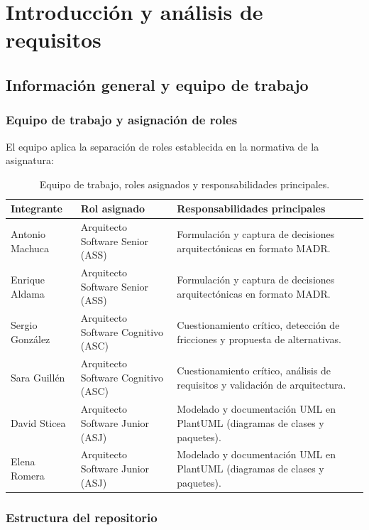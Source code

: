 \chapter{Introducción y análisis de requisitos}

\section{Información general y equipo de trabajo}


\subsection{Equipo de trabajo y asignación de roles}

El equipo aplica la separación de roles establecida en la normativa de la asignatura:

\begin{table}[H]
\centering
\caption{Equipo de trabajo, roles asignados y responsabilidades principales.}
\label{tab:equipo-roles}
\small
\begin{tabularx}{\textwidth}{@{}p{}p{}X@{}}
\toprule
\textbf{Integrante} & \textbf{Rol asignado} & \textbf{Responsabilidades principales} \\
\midrule
Antonio Machuca & Arquitecto Software Senior (ASS) & Formulación y captura de decisiones arquitectónicas en formato MADR. \\
Enrique Aldama & Arquitecto Software Senior (ASS) & Formulación y captura de decisiones arquitectónicas en formato MADR. \\
Sergio González & Arquitecto Software Cognitivo (ASC) & Cuestionamiento crítico, detección de fricciones y propuesta de alternativas. \\
Sara Guillén & Arquitecto Software Cognitivo (ASC) & Cuestionamiento crítico, análisis de requisitos y validación de arquitectura. \\
David Sticea & Arquitecto Software Junior (ASJ) & Modelado y documentación UML en PlantUML (diagramas de clases y paquetes). \\
Elena Romera & Arquitecto Software Junior (ASJ) & Modelado y documentación UML en PlantUML (diagramas de clases y paquetes). \\
\bottomrule
\end{tabularx}
\end{table}

\subsection{Estructura del repositorio}

